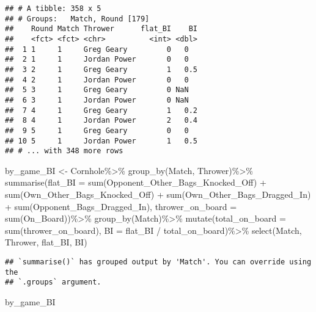 \documentclass[
]{article}
\newenvironment{Shaded}{\begin{snugshade}}{\end{snugshade}}
\newcommand{\AttributeTok}[1]{\textcolor[rgb]{0.77,0.63,0.00}{#1}}
\newcommand{\FunctionTok}[1]{\textcolor[rgb]{0.00,0.00,0.00}{#1}}
\newcommand{\NormalTok}[1]{#1}
\newcommand{\OtherTok}[1]{\textcolor[rgb]{0.56,0.35,0.01}{#1}}
\newcommand{\SpecialCharTok}[1]{\textcolor[rgb]{0.00,0.00,0.00}{#1}}
\begin{document}
\begin{verbatim}
## # A tibble: 358 x 5
## # Groups:   Match, Round [179]
##    Round Match Thrower      flat_BI    BI
##    <fct> <fct> <chr>          <int> <dbl>
##  1 1     1     Greg Geary         0   0  
##  2 1     1     Jordan Power       0   0  
##  3 2     1     Greg Geary         1   0.5
##  4 2     1     Jordan Power       0   0  
##  5 3     1     Greg Geary         0 NaN  
##  6 3     1     Jordan Power       0 NaN  
##  7 4     1     Greg Geary         1   0.2
##  8 4     1     Jordan Power       2   0.4
##  9 5     1     Greg Geary         0   0  
## 10 5     1     Jordan Power       1   0.5
## # ... with 348 more rows
\end{verbatim}

\begin{Shaded}
\begin{Highlighting}[]
\NormalTok{by\_game\_BI }\OtherTok{\textless{}{-}}\NormalTok{ Cornhole}\SpecialCharTok{\%\textgreater{}\%}
  \FunctionTok{group\_by}\NormalTok{(Match, Thrower)}\SpecialCharTok{\%\textgreater{}\%}
  \FunctionTok{summarise}\NormalTok{(}\AttributeTok{flat\_BI =} \FunctionTok{sum}\NormalTok{(Opponent\_Other\_Bags\_Knocked\_Off) }\SpecialCharTok{+} \FunctionTok{sum}\NormalTok{(Own\_Other\_Bags\_Knocked\_Off) }\SpecialCharTok{+} \FunctionTok{sum}\NormalTok{(Own\_Other\_Bags\_Dragged\_In) }\SpecialCharTok{+} \FunctionTok{sum}\NormalTok{(Opponent\_Bags\_Dragged\_In),}
            \AttributeTok{thrower\_on\_board =} \FunctionTok{sum}\NormalTok{(On\_Board))}\SpecialCharTok{\%\textgreater{}\%}
  \FunctionTok{group\_by}\NormalTok{(Match)}\SpecialCharTok{\%\textgreater{}\%}
  \FunctionTok{mutate}\NormalTok{(}\AttributeTok{total\_on\_board =} \FunctionTok{sum}\NormalTok{(thrower\_on\_board), }
         \AttributeTok{BI =}\NormalTok{ flat\_BI }\SpecialCharTok{/}\NormalTok{ total\_on\_board)}\SpecialCharTok{\%\textgreater{}\%}
  \FunctionTok{select}\NormalTok{(Match, Thrower, flat\_BI, BI)}
\end{Highlighting}
\end{Shaded}

\begin{verbatim}
## `summarise()` has grouped output by 'Match'. You can override using the
## `.groups` argument.
\end{verbatim}

\begin{Shaded}
\begin{Highlighting}[]
\NormalTok{by\_game\_BI}
\end{Highlighting}
\end{Shaded}
\end{document}
